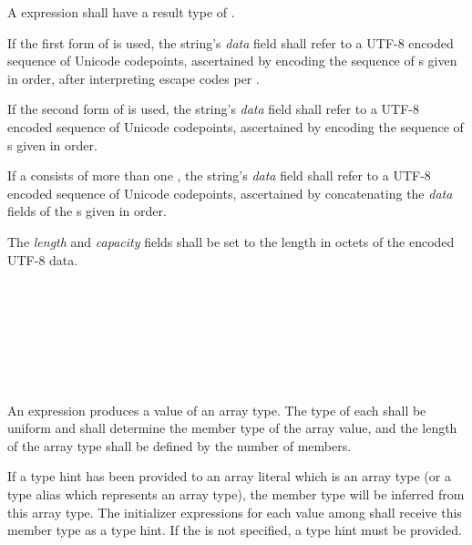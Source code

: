 \specsubsubitem
A  expression shall have a result type of
 .

\specsubsubitem
If the first form of  is used, the string's
\textit{data} field shall refer to a \hbox{UTF-8} encoded sequence of Unicode
codepoints, ascertained by encoding the sequence of s
given in order, after interpreting escape codes per
.

\specsubsubitem
If the second form of  is used, the string's
\textit{data} field shall refer to a \hbox{UTF-8} encoded sequence of Unicode
codepoints, ascertained by encoding the sequence of
s given in order.

\specsubsubitem
If a  consists of more than one
, the string's \textit{data} field shall refer to
a \hbox{UTF-8} encoded sequence of Unicode codepoints, ascertained by
concatenating the \textit{data} fields of the s
given in order.

\specsubsubitem
The \textit{length} and \textit{capacity} fields shall be set to the length in
octets of the encoded \hbox{UTF-8} data.


\begin{grammar}
 \\
	\terminal{[}  \terminal{]} \\

 \\
	 \optional{\terminal{,}} \\
	  \optional{\terminal{,}} \\
	 \terminal{,}  \\
\end{grammar}

\specsubsubitem
An  expression produces a value of an array type.
The type of each  shall be uniform and shall
determine the member type of the array value, and the length of the array type
shall be defined by the number of members.

\specsubsubitem
If a type hint has been provided to an array literal which is an array type (or
a type alias which represents an array type), the member type will be inferred
from this array type. The initializer expressions for each value among
 shall receive this member type as a type hint. If
the  is not specified, a type hint must be provided.


